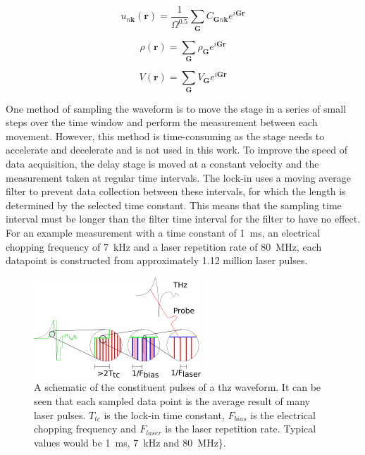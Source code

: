 \begin{equation}
u_{n\mathbf{k}}(\mathbf{r}) = \frac{1}{\Omega^{0.5}} \sum_{\boldsymbol{G}} C_{\boldsymbol{G}n\mathbf{k}}e^{i\boldsymbol{G}\mathbf{r}}
\end{equation}

\begin{equation}
\rho(\mathbf{r}) = \sum_{\boldsymbol{G}} \rho_{\boldsymbol{G}} e^{i\boldsymbol{G}\mathbf{r}}
\end{equation}

\begin{equation}
V(\mathbf{r}) = \sum_{\boldsymbol{G}} V_{\boldsymbol{G}} e^{i\boldsymbol{G}\mathbf{r}}
\end{equation} 

One method of sampling the waveform is to move the stage in a series of small steps over the time window and perform the measurement between each movement. However, this method is time-consuming as the stage needs to accelerate and decelerate and is not used in this work. To improve the speed of data acquisition, the delay stage is moved at a constant velocity and the measurement taken at regular time intervals. The lock-in uses a moving average filter to prevent data collection between these intervals, for which the length is determined by the selected time constant. This means that the sampling time interval must be longer than the filter time interval for the filter to have no effect. For an example measurement with a time constant of \SI{1}{ms}, an electrical chopping frequency of \SI{7}{kHz} and a laser repetition rate of \SI{80}{MHz}, each datapoint is constructed from approximately 1.12 million laser pulses.

\begin{figure}
    \centering
    \includegraphics{Figures/Misc/Theory/THzConstituentPulses.png}
    \captionsetup{font = footnotesize, justification = centering}
    \caption{A schematic of the constituent pulses of a \acrshort{thz} waveform. It can be seen that each sampled data point is the average result of many laser pulses. \(T_{tc}\) is the lock-in time constant, \(F_{bias}\) is the electrical chopping frequency and \(F_{laser}\) is the laser repetition rate. Typical values would be \SI{1}{ms}, \SI{7}{kHz} and \SI{80}{MHz}\}.}
    \label{fig:THzPulses}
\end{figure}

